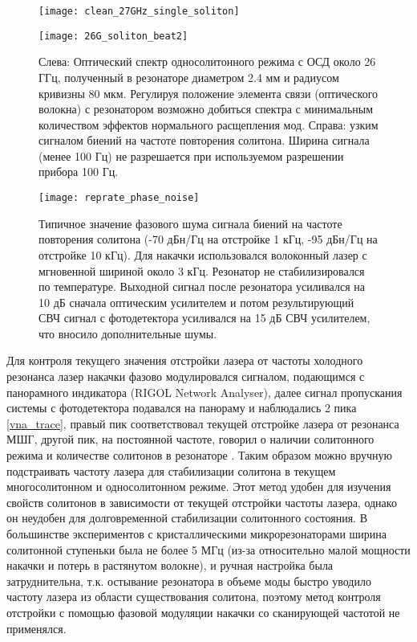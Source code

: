 \begin{figure}[ht]
  \begin{minipage}[ht]{0.49\linewidth}\centering
    \texttt{[image: clean\_27GHz\_single\_soliton]}
  \end{minipage}
  \hfill
  \begin{minipage}[ht]{0.49\linewidth}\centering
    \texttt{[image: 26G\_soliton\_beat2]}
  \end{minipage}
  \caption{Слева: Оптический спектр односолитонного режима с ОСД около 26 ГГц, полученный в резонаторе диаметром 2.4 мм и радиусом кривизны 80 мкм. Регулируя положение элемента связи (оптического волокна) с резонатором возможно добиться спектра с минимальным количеством эффектов нормального расщепления мод. Справа: узким сигналом биений на частоте повторения солитона. Ширина сигнала (менее 100 Гц) не разрешается при используемом разрешении прибора 100 Гц.}
  \label{clean_27GHz_single_soliton}
\end{figure}

\begin{figure}[ht]
  \texttt{[image: reprate\_phase\_noise]}\centering
  \caption{Типичное значение фазового шума сигнала биений на частоте повторения солитона (-70 дБн/Гц на отстройке 1 кГц, -95 дБн/Гц на отстройке 10 кГц). Для накачки использовался волоконный лазер с мгновенной шириной около 3 кГц. Резонатор не стабилизировался по температуре. Выходной сигнал после резонатора усиливался на 10 дБ сначала оптическим усилителем и потом результирующий СВЧ сигнал с фотодетектора усиливался на 15 дБ СВЧ усилителем, что вносило дополнительные шумы.}
  \label{reprate_phase_noise}
\end{figure}


Для контроля текущего значения отстройки лазера от частоты холодного резонанса лазер накачки фазово модулировался сигналом, подающимся с панорамного индикатора (RIGOL Network Analyser), далее сигнал пропускания системы с фотодетектора подавался на панораму и наблюдались 2 пика \ref{vna_trace}, правый пик соответствовал текущей отстройке лазера от резонанса МШГ, другой пик, на постоянной частоте, говорил о наличии солитонного режима и количестве солитонов в резонаторе \cite{Karpov2017}. Таким образом можно вручную подстраивать частоту лазера для стабилизации солитона в текущем многосолитонном и односолитонном режиме. Этот метод удобен для изучения свойств солитонов в зависимости от текущей отстройки частоты лазера, однако он неудобен для долговременной стабилизации солитонного состояния. В большинстве экспериментов с кристаллическими микрорезонаторами ширина солитонной ступеньки была не более 5 МГц (из-за относительно малой мощности накачки и потерь в растянутом волокне), и ручная настройка была затруднительна, т.к. остывание резонатора в объеме моды быстро уводило частоту лазера из области существования солитона, поэтому метод контроля отстройки с помощью фазовой модуляции накачки со сканирующей частотой не применялся.

